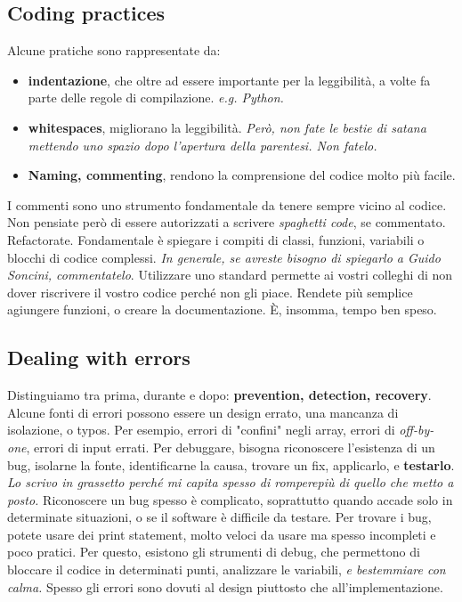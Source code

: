 \documentclass[11pt]{article}
\begin{document}
\subsection{Coding practices}
Alcune pratiche sono rappresentate da:
\begin{itemize}
    \item \textbf{indentazione}, che oltre ad essere importante per la leggibilità, a volte fa parte delle regole di compilazione. \textit{e.g. Python.}
    \item \textbf{whitespaces}, migliorano la leggibilità. \textit{Però, non fate le bestie di satana mettendo uno spazio dopo l'apertura della parentesi. Non fatelo. }
    \item \textbf{Naming, commenting}, rendono la comprensione del codice molto più facile.
\end{itemize}
I commenti sono uno strumento fondamentale da tenere sempre vicino al codice. Non pensiate però di essere autorizzati a scrivere \textit{spaghetti code}, se commentato. Refactorate. Fondamentale è spiegare i compiti di classi, funzioni, variabili o blocchi di codice complessi. \textit{In generale, se avreste bisogno di spiegarlo a Guido Soncini, commentatelo}. Utilizzare uno standard permette ai vostri colleghi di non dover riscrivere il vostro codice perché non gli piace. Rendete più semplice agiungere funzioni, o creare la documentazione. È, insomma, tempo ben speso. 
\subsection{Dealing with errors}
Distinguiamo tra prima, durante e dopo: \textbf{prevention, detection, recovery}. Alcune fonti di errori possono essere un design errato, una mancanza di isolazione, o typos. Per esempio, errori di "confini" negli array, errori di \textit{off-by-one}, errori di input errati. Per debuggare, bisogna riconoscere l'esistenza di un bug, isolarne la fonte, identificarne la causa, trovare un fix, applicarlo, e \textbf{testarlo}. \textit{Lo scrivo in grassetto perché mi capita spesso di romperepiù di quello che metto a posto.} 
Riconoscere un bug spesso è complicato, soprattutto quando accade solo in determinate situazioni, o se il software è difficile da testare. Per trovare i bug, potete usare dei print statement, molto veloci da usare ma spesso incompleti e poco pratici. Per questo, esistono gli strumenti di debug, che permettono di bloccare il codice in determinati punti, analizzare le variabili, \textit{e bestemmiare con calma.} Spesso gli errori sono dovuti al design piuttosto che all'implementazione. 
\end{document}

